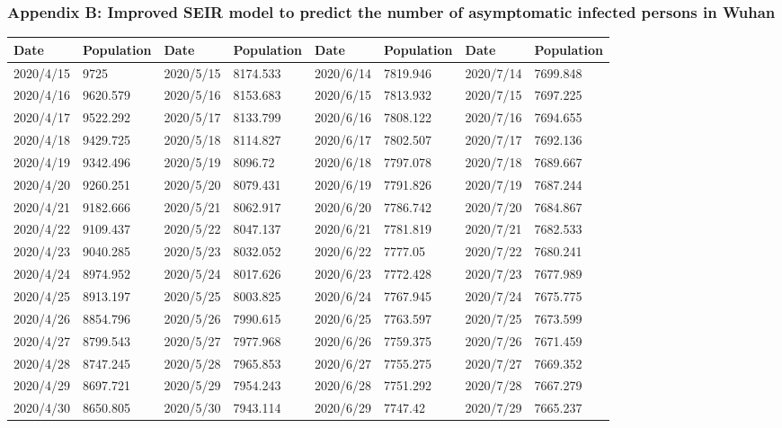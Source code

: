 \documentclass[a4paper, 11pt,twoside=true]{scrartcl}
\begin{document}
\subsubsection*{Appendix B: Improved SEIR model to predict the number of asymptomatic infected persons in Wuhan}
\begin{table}[H]
	\begin{tabular}{llllllll}
		\hline
		Date        & Population       & Date        & Population  &Date        & Population&Date        & Population \\ \hline
		2020/4/15 & 9725     & 2020/5/15 & 8174.533 & 2020/6/14 & 7819.946 & 2020/7/14 & 7699.848 \\
		2020/4/16 & 9620.579 & 2020/5/16 & 8153.683 & 2020/6/15 & 7813.932 & 2020/7/15 & 7697.225 \\
		2020/4/17 & 9522.292 & 2020/5/17 & 8133.799 & 2020/6/16 & 7808.122 & 2020/7/16 & 7694.655 \\
		2020/4/18 & 9429.725 & 2020/5/18 & 8114.827 & 2020/6/17 & 7802.507 & 2020/7/17 & 7692.136 \\
		2020/4/19 & 9342.496 & 2020/5/19 & 8096.72  & 2020/6/18 & 7797.078 & 2020/7/18 & 7689.667 \\
		2020/4/20 & 9260.251 & 2020/5/20 & 8079.431 & 2020/6/19 & 7791.826 & 2020/7/19 & 7687.244 \\
		2020/4/21 & 9182.666 & 2020/5/21 & 8062.917 & 2020/6/20 & 7786.742 & 2020/7/20 & 7684.867 \\
		2020/4/22 & 9109.437 & 2020/5/22 & 8047.137 & 2020/6/21 & 7781.819 & 2020/7/21 & 7682.533 \\
		2020/4/23 & 9040.285 & 2020/5/23 & 8032.052 & 2020/6/22 & 7777.05  & 2020/7/22 & 7680.241 \\
		2020/4/24 & 8974.952 & 2020/5/24 & 8017.626 & 2020/6/23 & 7772.428 & 2020/7/23 & 7677.989 \\
		2020/4/25 & 8913.197 & 2020/5/25 & 8003.825 & 2020/6/24 & 7767.945 & 2020/7/24 & 7675.775 \\
		2020/4/26 & 8854.796 & 2020/5/26 & 7990.615 & 2020/6/25 & 7763.597 & 2020/7/25 & 7673.599 \\
		2020/4/27 & 8799.543 & 2020/5/27 & 7977.968 & 2020/6/26 & 7759.375 & 2020/7/26 & 7671.459 \\
		2020/4/28 & 8747.245 & 2020/5/28 & 7965.853 & 2020/6/27 & 7755.275 & 2020/7/27 & 7669.352 \\
		2020/4/29 & 8697.721 & 2020/5/29 & 7954.243 & 2020/6/28 & 7751.292 & 2020/7/28 & 7667.279 \\
		2020/4/30 & 8650.805 & 2020/5/30 & 7943.114 & 2020/6/29 & 7747.42  & 2020/7/29 & 7665.237 \\

\end{tabular}
\end{table}
\end{document}
